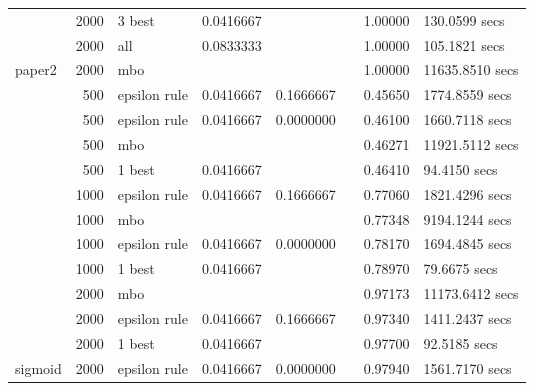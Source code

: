 \begin{longtable}[t]{lrlrrrrl}
 & 2000 & 3 best & 0.0416667 &  &  & 1.00000 & 130.0599 secs\\

 & 2000 & all & 0.0833333 &  &  & 1.00000 & 105.1821 secs\\

\multirow{-12}{*}{\raggedright\arraybackslash paper2} & 2000 & mbo &  &  &  & 1.00000 & 11635.8510 secs\\
\cmidrule{1-8}
 & 500 & epsilon rule & 0.0416667 & 0.1666667 &  & 0.45650 & 1774.8559 secs\\

 & 500 & epsilon rule & 0.0416667 & 0.0000000 &  & 0.46100 & 1660.7118 secs\\

 & 500 & mbo &  &  &  & 0.46271 & 11921.5112 secs\\

 & 500 & 1 best & 0.0416667 &  &  & 0.46410 & 94.4150 secs\\

 & 1000 & epsilon rule & 0.0416667 & 0.1666667 &  & 0.77060 & 1821.4296 secs\\

 & 1000 & mbo &  &  &  & 0.77348 & 9194.1244 secs\\

 & 1000 & epsilon rule & 0.0416667 & 0.0000000 &  & 0.78170 & 1694.4845 secs\\

 & 1000 & 1 best & 0.0416667 &  &  & 0.78970 & 79.6675 secs\\

 & 2000 & mbo &  &  &  & 0.97173 & 11173.6412 secs\\

 & 2000 & epsilon rule & 0.0416667 & 0.1666667 &  & 0.97340 & 1411.2437 secs\\

 & 2000 & 1 best & 0.0416667 &  &  & 0.97700 & 92.5185 secs\\

\multirow{-12}{*}{\raggedright\arraybackslash sigmoid} & 2000 & epsilon rule & 0.0416667 & 0.0000000 &  & 0.97940 & 1561.7170 secs\\
\bottomrule
\end{longtable}
